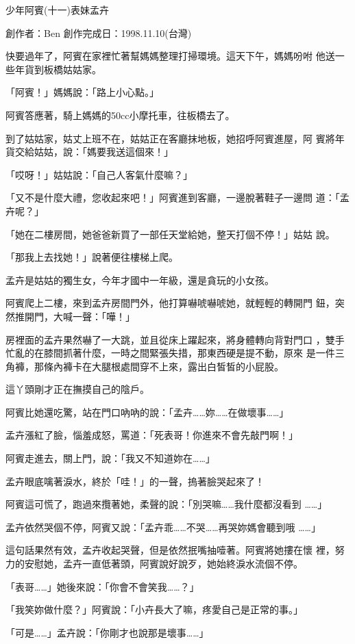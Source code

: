 



少年阿賓(十一)表妹孟卉

創作者：Ben
創作完成日：1998.11.10(台灣)


快要過年了，阿賓在家裡忙著幫媽媽整理打掃環境。這天下午，媽媽吩咐
他送一些年貨到板橋姑姑家。

「阿賓！」媽媽說：「路上小心點。」

阿賓答應著，騎上媽媽的50cc小摩托車，往板橋去了。

到了姑姑家，姑丈上班不在，姑姑正在客廳抹地板，她招呼阿賓進屋，阿
賓將年貨交給姑姑，說：「媽要我送這個來！」

「哎呀！」姑姑說：「自己人客氣什麼嘛？」

「又不是什麼大禮，您收起來吧！」阿賓進到客廳，一邊脫著鞋子一邊問
道：「孟卉呢？」

「她在二樓房間，她爸爸新買了一部任天堂給她，整天打個不停！」姑姑
說。

「那我上去找她！」說著便往樓梯上爬。

孟卉是姑姑的獨生女，今年才國中一年級，還是貪玩的小女孩。

阿賓爬上二樓，來到孟卉房間門外，他打算嚇唬嚇唬她，就輕輕的轉開門
鈕，突然推開門，大喊一聲：「嘩！」

房裡面的孟卉果然嚇了一大跳，並且從床上躍起來，將身體轉向背對門口
，雙手忙亂的在膝間抓著什麼，一時之間緊張失措，那東西硬是提不動，原來
是一件三角褲，那條內褲卡在大腿根處間穿不上來，露出白皙皙的小屁股。

這丫頭剛才正在撫摸自己的陰戶。

阿賓比她還吃驚，站在門口吶吶的說：「孟卉……妳……在做壞事……」

孟卉漲紅了臉，惱羞成怒，罵道：「死表哥！你進來不會先敲門啊！」

阿賓走進去，關上門，說：「我又不知道妳在……」

孟卉眼底噙著淚水，終於「哇！」的一聲，摀著臉哭起來了！

阿賓這可慌了，跑過來攬著她，柔聲的說：「別哭嘛……我什麼都沒看到
……」

孟卉依然哭個不停，阿賓又說：「孟卉乖……不哭……再哭妳媽會聽到哦
……」

這句話果然有效，孟卉收起哭聲，但是依然抿嘴抽噎著。阿賓將她摟在懷
裡，努力的安慰她，孟卉一直低著頭，阿賓說好說歹，她始終淚水流個不停。

「表哥……」她後來說：「你會不會笑我……？」

「我笑妳做什麼？」阿賓說：「小卉長大了嘛，疼愛自己是正常的事。」

「可是……」孟卉說：「你剛才也說那是壞事……」

